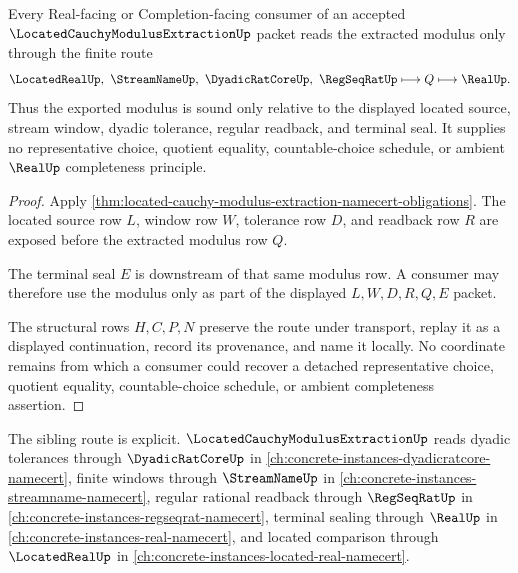 \begin{theorem}
\label{thm:located-cauchy-modulus-extraction-modulus-soundness}
Every Real-facing or Completion-facing consumer of an accepted $\LocatedCauchyModulusExtractionUp$ packet reads the extracted modulus only through the finite route
$$
\LocatedRealUp,\ \StreamNameUp,\ \DyadicRatCoreUp,\ \RegSeqRatUp
\longmapsto
Q
\longmapsto
\RealUp .
$$
Thus the exported modulus is sound only relative to the displayed located source, stream window, dyadic tolerance, regular readback, and terminal seal. It supplies no representative choice, quotient equality, countable-choice schedule, or ambient $\RealUp$ completeness principle.
\end{theorem}
\begin{proof}
Apply \autoref{thm:located-cauchy-modulus-extraction-namecert-obligations}. The located source row $L$, window row $W$, tolerance row $D$, and readback row $R$ are exposed before the extracted modulus row $Q$.

The terminal seal $E$ is downstream of that same modulus row. A consumer may therefore use the modulus only as part of the displayed $L,W,D,R,Q,E$ packet.

The structural rows $H,C,P,N$ preserve the route under transport, replay it as a displayed continuation, record its provenance, and name it locally. No coordinate remains from which a consumer could recover a detached representative choice, quotient equality, countable-choice schedule, or ambient completeness assertion.
\end{proof}

The sibling route is explicit. $\LocatedCauchyModulusExtractionUp$ reads dyadic tolerances through $\DyadicRatCoreUp$ in \autoref{ch:concrete-instances-dyadicratcore-namecert}, finite windows through $\StreamNameUp$ in \autoref{ch:concrete-instances-streamname-namecert}, regular rational readback through $\RegSeqRatUp$ in \autoref{ch:concrete-instances-regseqrat-namecert}, terminal sealing through $\RealUp$ in \autoref{ch:concrete-instances-real-namecert}, and located comparison through $\LocatedRealUp$ in \autoref{ch:concrete-instances-located-real-namecert}.


